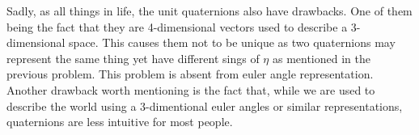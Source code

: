 Sadly, as all things in life, the unit quaternions also have drawbacks. One of them being the fact that they are 4-dimensional vectors used to describe a 3-dimensional space. This causes them not to be unique as two quaternions may represent the same thing yet have different sings of $\eta$ as mentioned in the previous problem. This problem is absent from euler angle representation. Another drawback worth mentioning is the fact that, while we are used to describe the world using a 3-dimentional euler angles or similar representations, quaternions are less intuitive for most people.

 

